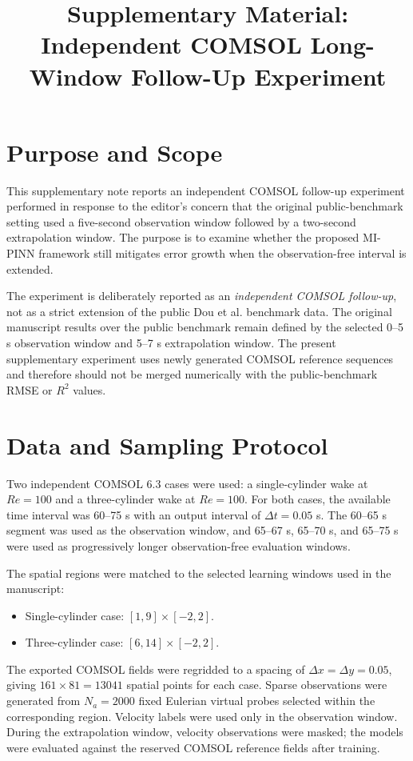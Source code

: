 \documentclass[11pt]{article}
\title{Supplementary Material: Independent COMSOL Long-Window Follow-Up Experiment}
\author{}
\date{}
\begin{document}
\maketitle

\section*{Purpose and Scope}

This supplementary note reports an independent COMSOL follow-up experiment performed in response to the editor's concern that the original public-benchmark setting used a five-second observation window followed by a two-second extrapolation window. The purpose is to examine whether the proposed MI-PINN framework still mitigates error growth when the observation-free interval is extended.

The experiment is deliberately reported as an \emph{independent COMSOL follow-up}, not as a strict extension of the public Dou et al. benchmark data. The original manuscript results over the public benchmark remain defined by the selected 0--5 s observation window and 5--7 s extrapolation window. The present supplementary experiment uses newly generated COMSOL reference sequences and therefore should not be merged numerically with the public-benchmark RMSE or $R^2$ values.

\section*{Data and Sampling Protocol}

Two independent COMSOL 6.3 cases were used: a single-cylinder wake at $Re=100$ and a three-cylinder wake at $Re=100$. For both cases, the available time interval was 60--75 s with an output interval of $\Delta t=0.05$ s. The 60--65 s segment was used as the observation window, and 65--67 s, 65--70 s, and 65--75 s were used as progressively longer observation-free evaluation windows.

The spatial regions were matched to the selected learning windows used in the manuscript:
\begin{itemize}
\item Single-cylinder case: $[1,9]\times[-2,2]$.
\item Three-cylinder case: $[6,14]\times[-2,2]$.
\end{itemize}

The exported COMSOL fields were regridded to a spacing of $\Delta x=\Delta y=0.05$, giving $161\times81=13041$ spatial points for each case. Sparse observations were generated from $N_a=2000$ fixed Eulerian virtual probes selected within the corresponding region. Velocity labels were used only in the observation window. During the extrapolation window, velocity observations were masked; the models were evaluated against the reserved COMSOL reference fields after training.
\end{document}

